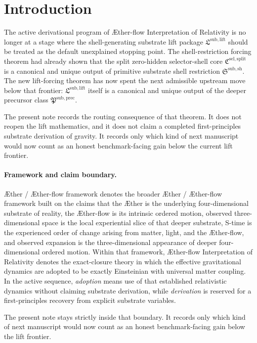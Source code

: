 \documentclass[11pt]{article}
\newcommand{\Aether}{\AE{}ther}
\newcommand{\Aflow}{\AE{}ther-flow}
\newcommand{\TheoryName}{\Aflow{} Interpretation of Relativity}
\newcommand{\TheoryProgram}{\Aether{} / \Aflow{} framework}
\newcommand{\SelectorCore}{\mathfrak C^{\mathrm{sel,split}}}
\newcommand{\ShellRestriction}{\mathfrak S^{\mathrm{sub,sh}}}
\newcommand{\LiftPackage}{\mathfrak L^{\mathrm{sub,lift}}}
\newcommand{\PrecursorPackage}{\mathfrak P^{\mathrm{sub,prec}}}
\begin{document}
\section{Introduction}

The active derivational program of \TheoryName{} is no longer at a stage where the shell-generating substrate lift package \(\LiftPackage\) should be treated as the default unexplained stopping point. The shell-restriction forcing theorem had already shown that the split zero-hidden selector-shell core \(\SelectorCore\) is a canonical and unique output of primitive substrate shell restriction \(\ShellRestriction\). The new lift-forcing theorem has now spent the next admissible upstream move below that frontier: \(\LiftPackage\) itself is a canonical and unique output of the deeper precursor class \(\PrecursorPackage\).

The present note records the routing consequence of that theorem. It does not reopen the lift mathematics, and it does not claim a completed first-principles substrate derivation of gravity. It records only which kind of next manuscript would now count as an honest benchmark-facing gain below the current lift frontier.

\paragraph{Framework and claim boundary.}
\TheoryProgram{} denotes the broader \Aether{} / \Aflow{} framework built on the claims that the \Aether{} is the underlying four-dimensional substrate of reality, the \Aflow{} is its intrinsic ordered motion, observed three-dimensional space is the local experiential slice of that deeper substrate, S-time is the experienced order of change arising from matter, light, and the \Aflow{}, and observed expansion is the three-dimensional appearance of deeper four-dimensional ordered motion. Within that framework, \TheoryName{} denotes the exact-closure theory in which the effective gravitational dynamics are adopted to be exactly Einsteinian with universal matter coupling. In the active sequence, \emph{adoption} means use of that established relativistic dynamics without claiming substrate derivation, while \emph{derivation} is reserved for a first-principles recovery from explicit substrate variables.

The present note stays strictly inside that boundary. It records only which kind of next manuscript would now count as an honest benchmark-facing gain below the lift frontier.
\end{document}
